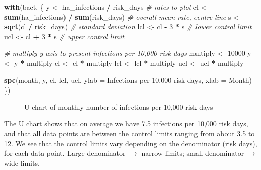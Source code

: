 \documentclass[
]{book}
\makeatletter
\newenvironment{Shaded}{\begin{snugshade}}{\end{snugshade}}
\newcommand{\AttributeTok}[1]{\textcolor[rgb]{0.13,0.29,0.53}{#1}}
\newcommand{\CommentTok}[1]{\textcolor[rgb]{0.56,0.35,0.01}{\textit{#1}}}
\newcommand{\DecValTok}[1]{\textcolor[rgb]{0.00,0.00,0.81}{#1}}
\newcommand{\FunctionTok}[1]{\textcolor[rgb]{0.13,0.29,0.53}{\textbf{#1}}}
\newcommand{\NormalTok}[1]{#1}
\newcommand{\OtherTok}[1]{\textcolor[rgb]{0.56,0.35,0.01}{#1}}
\newcommand{\SpecialCharTok}[1]{\textcolor[rgb]{0.81,0.36,0.00}{\textbf{#1}}}
\newcommand{\StringTok}[1]{\textcolor[rgb]{0.31,0.60,0.02}{#1}}
\newcommand*\pandocbounded[1]{%
  \sbox\pandoc@box{#1}%
  \Gscale@div\@tempa{\textheight}{\dimexpr\ht\pandoc@box+\dp\pandoc@box\relax}%
  \Gscale@div\@tempb{\linewidth}{\wd\pandoc@box}%
  \ifdim\@tempb\p@<\@tempa\p@\let\@tempa\@tempb\fi%
  \ifdim\@tempa\p@<\p@\scalebox{\@tempa}{\usebox\pandoc@box}%
  \else\usebox{\pandoc@box}%
  \fi%
}
\makeatother
\begin{document}
\begin{Shaded}
\begin{Highlighting}[]
\FunctionTok{with}\NormalTok{(bact, \{}
\NormalTok{  y   }\OtherTok{\textless{}{-}}\NormalTok{ ha\_infections }\SpecialCharTok{/}\NormalTok{ risk\_days           }\CommentTok{\# rates to plot}
\NormalTok{  cl  }\OtherTok{\textless{}{-}} \FunctionTok{sum}\NormalTok{(ha\_infections) }\SpecialCharTok{/} \FunctionTok{sum}\NormalTok{(risk\_days) }\CommentTok{\# overall mean rate, centre line}
\NormalTok{  s   }\OtherTok{\textless{}{-}} \FunctionTok{sqrt}\NormalTok{(cl }\SpecialCharTok{/}\NormalTok{ risk\_days)                }\CommentTok{\# standard deviation}
\NormalTok{  lcl }\OtherTok{\textless{}{-}}\NormalTok{ cl }\SpecialCharTok{{-}} \DecValTok{3} \SpecialCharTok{*}\NormalTok{ s                          }\CommentTok{\# lower control limit}
\NormalTok{  ucl }\OtherTok{\textless{}{-}}\NormalTok{ cl }\SpecialCharTok{+} \DecValTok{3} \SpecialCharTok{*}\NormalTok{ s                          }\CommentTok{\# upper control limit}
  
  \CommentTok{\# multiply y axis to present infections per 10,000 risk days}
\NormalTok{  multiply }\OtherTok{\textless{}{-}} \DecValTok{10000}
\NormalTok{  y        }\OtherTok{\textless{}{-}}\NormalTok{ y }\SpecialCharTok{*}\NormalTok{ multiply}
\NormalTok{  cl       }\OtherTok{\textless{}{-}}\NormalTok{ cl }\SpecialCharTok{*}\NormalTok{ multiply}
\NormalTok{  lcl      }\OtherTok{\textless{}{-}}\NormalTok{ lcl }\SpecialCharTok{*}\NormalTok{ multiply}
\NormalTok{  ucl      }\OtherTok{\textless{}{-}}\NormalTok{ ucl }\SpecialCharTok{*}\NormalTok{ multiply}
  
  \FunctionTok{spc}\NormalTok{(month, y, cl, lcl, ucl, }
      \AttributeTok{ylab =} \StringTok{\textquotesingle{}Infections per 10,000 risk days\textquotesingle{}}\NormalTok{,}
      \AttributeTok{xlab =} \StringTok{\textquotesingle{}Month\textquotesingle{}}\NormalTok{)}
\NormalTok{\})}
\end{Highlighting}
\end{Shaded}

\begin{figure}
\centering
\pandocbounded{}
\caption{\label{fig:limits-u}U chart of monthly number of infections per 10,000 risk days}
\end{figure}

The U chart shows that on average we have 7.5 infections per 10,000 risk days, and that all data points are between the control limits ranging from about 3.5 to 12. We see that the control limits vary depending on the denominator (risk days), for each data point. Large denominator \(\rightarrow\) narrow limits; small denominator \(\rightarrow\) wide limits.
\end{document}
